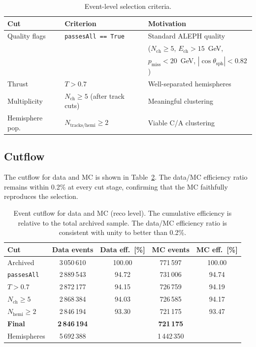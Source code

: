\documentclass[11pt,a4paper]{article}
\begin{document}
\begin{table}[htbp]
\centering
\caption{Event-level selection criteria.}
\label{tbl:event-cuts}
\begin{tabular}{lll}
\toprule
Cut & Criterion & Motivation \\
\midrule
Quality flags & \texttt{passesAll == True} &
  Standard ALEPH quality \\
 & & ($N_\text{ch} \ge 5$, $E_\text{ch} > 15$~GeV, \\
 & & $p_\text{miss} < 20$~GeV, $|\cos\theta_\text{sph}| < 0.82$) \\
Thrust & $T > 0.7$ & Well-separated hemispheres \\
Multiplicity & $N_\text{ch} \ge 5$ (after track cuts) & Meaningful clustering \\
Hemisphere pop. & $N_\text{tracks/hemi} \ge 2$ & Viable C/A clustering \\
\bottomrule
\end{tabular}
\end{table}

\subsection{Cutflow}
\label{sec:cutflow}

The cutflow for data and MC is shown in Table~\ref{tbl:cutflow}.
The data/MC efficiency ratio remains within 0.2\% at every cut stage,
confirming that the MC faithfully reproduces the selection.

\begin{table}[htbp]
\centering
\caption{Event cutflow for data and MC (reco level).  The cumulative
  efficiency is relative to the total archived sample.  The data/MC
  efficiency ratio is consistent with unity to better than 0.2\%.}
\label{tbl:cutflow}
\begin{tabular}{lcccc}
\toprule
Cut & Data events & Data eff.\ [\%] & MC events & MC eff.\ [\%] \\
\midrule
Archived & 3\,050\,610 & 100.00 & 771\,597 & 100.00 \\
\texttt{passesAll} & 2\,889\,543 & 94.72 & 731\,006 & 94.74 \\
$T > 0.7$ & 2\,872\,177 & 94.15 & 726\,759 & 94.19 \\
$N_\text{ch} \ge 5$ & 2\,868\,384 & 94.03 & 726\,585 & 94.17 \\
$N_\text{hemi} \ge 2$ & 2\,846\,194 & 93.30 & 721\,175 & 93.47 \\
\midrule
\textbf{Final} & \textbf{2\,846\,194} & & \textbf{721\,175} & \\
Hemispheres & 5\,692\,388 & & 1\,442\,350 & \\
\bottomrule
\end{tabular}
\end{table}
\end{document}
